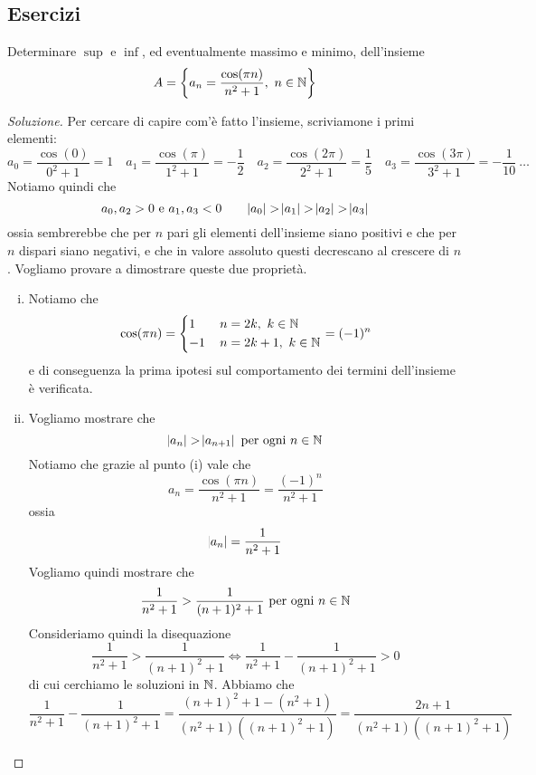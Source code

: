 \subsection{Esercizi}
\begin{exercise}
    \label{ex:2.1}
    Determinare $\sup$ e $\inf$, ed eventualmente massimo e minimo, dell'insieme
    \[
    A = \left\{ a_n = \frac{\cos(\pi n)}{n^2+1}, \ n\in\amsbb{N}\right\}
    \]
\end{exercise}
\begin{proof}[Soluzione]
    Per cercare di capire com'è fatto l'insieme, scriviamone i primi elementi:
    \[
    a_0 = \frac{\cos(0)}{0^2+1} = 1 \quad a_1 = \frac{\cos(\pi)}{1^2+1} = -\frac{1}{2}\quad a_2 = \frac{\cos(2\pi)}{2^2+1} = \frac{1}{5} \quad  a_3 = \frac{\cos(3\pi)}{3^2+1} = -\frac{1}{10} \ \dots
    \]
    Notiamo quindi che
     \[
     a_0, a_2 >0  \ \text{e} \ a_1, a_3<0
         \qquad \abs{a_0}>\abs{a_1}>\abs{a_2}>\abs{a_3}
    \]
    ossia sembrerebbe che per $n$ pari gli elementi dell'insieme siano positivi e che per $n$ dispari siano negativi, e che in valore assoluto questi decrescano al crescere di $n$. Vogliamo provare a dimostrare queste due proprietà.
    \begin{enumerate}[(i)]
        \item Notiamo che
        \[
        \cos(\pi n) = \begin{dcases}
            1\, & n = 2k, \ k\in \amsbb{N}\\
            -1\, & n=2k+1, \ k\in\amsbb{N}
        \end{dcases} = (-1)^n
        \]
        e di conseguenza la prima ipotesi sul comportamento dei termini dell'insieme è verificata.
        \item Vogliamo mostrare che
        \[
        \abs{a_n}>\abs{a_{n+1}} \ \text{per ogni} \ n\in\amsbb{N}
        \]
        Notiamo che grazie al punto (i) vale che
        \[
        a_n = \frac{\cos(\pi n)}{n^2+1} = \frac{(-1)^n}{n^2+1}
        \]
        ossia 
        \[
        \abs{a_n} = \frac{1}{n^2+1}
        \]
        Vogliamo quindi mostrare che 
        \[
        \frac{1}{n^2+1}>\frac{1}{(n+1)^2+1} \ \text{per ogni} \ n\in\amsbb{N}
        \]
        Consideriamo quindi la disequazione
        \[
        \frac{1}{n^2+1}>\frac{1}{(n+1)^2+1} \iff \frac{1}{n^2+1}-\frac{1}{(n+1)^2+1}>0
        \]
        di cui cerchiamo le soluzioni in $\amsbb{N}$. Abbiamo che
        \[
        \frac{1}{n^2+1}-\frac{1}{(n+1)^2+1} = \frac{(n+1)^2+1-(n^2+1)}{(n^2+1)((n+1)^2+1)} = \frac{2n+1}{(n^2+1)((n+1)^2+1)}
\]
\end{enumerate}
\end{proof}
